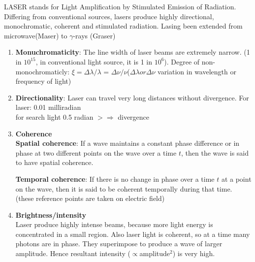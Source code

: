 \documentclass[12pt, a4paper]{article}
\begin{document}
LASER stands for Light Amplification by Stimulated Emission of Radiation. Differing from conventional sources, lasers produce highly
directional, monochromatic, coherent and stimulated radiation. Lasing been extended from microwave(Maser) to $\gamma$-rays (Graser)


\begin{enumerate}
	\item \textbf{Monuchromaticity}: The line width of laser beams are extremely narrow. (1 in $10^{15}$, in conventional light source, it is 1 in $10^6$). Degree of non-monochromaticly: $\xi=\Delta\lambda/\lambda$ = $\Delta\nu/\nu$($\Delta\lambda or \Delta\nu$  variation in wavelength or frequency of light)
	\item \textbf{Directionality}: Laser can travel very long distances without divergence.
	      For laser: 0.01 milliradian\\
	      for search light 0.5 radian
	      $>\Rightarrow$ divergence
	\item \textbf{Coherence}\\
	      \textbf{Spatial coherence}: If a wave maintains a constant phase difference or in phase at two different points on
	      the wave over a time $t$, then the wave is said to have spatial coherence.

	      \textbf{Temporal coherence}: If there is no change in phase over a time $t$ at a point on the wave, then it is said to be coherent temporally
	      during that time. (these reference points are taken on electric field)
	\item \textbf{Brightness/intensity}\\
	      Laser produce highly intense beams, because more light energy is concentrated in a small region. Also laser light is coherent, so at a time many photons are in phase. They superimpose to produce a wave of larger amplitude. Hence resultant intensity ($\propto$amplitude$^2$) is very high.
\end{enumerate}

\noparindent
\begin{framed}
\end{framed}
\end{document}

